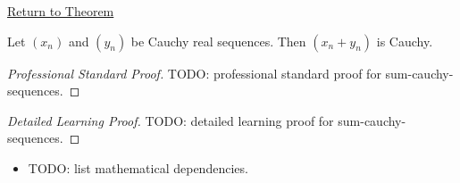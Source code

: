 \newpage
{}
\label{prf:sum-cauchy-sequences}

\begin{remark*}[Return]
\hyperref[thm:sum-cauchy-sequences]{Return to Theorem}
\end{remark*}

\begin{theorem*}
Let $(x_n)$ and $(y_n)$ be Cauchy real sequences. Then $(x_n+y_n)$ is
Cauchy.

\smallskip
\noindent
\end{theorem*}

\begin{proof}[Professional Standard Proof]
\LRAProofBodyStart
TODO: professional standard proof for sum-cauchy-sequences.
\end{proof}

\begin{proof}[Detailed Learning Proof]
\LRAProofBodyStart
TODO: detailed learning proof for sum-cauchy-sequences.
\end{proof}

\begin{remark*}
\end{remark*}

\begin{dependencies}
\begin{itemize}
  \item TODO: list mathematical dependencies.
\end{itemize}
\end{dependencies}

\clearpage
